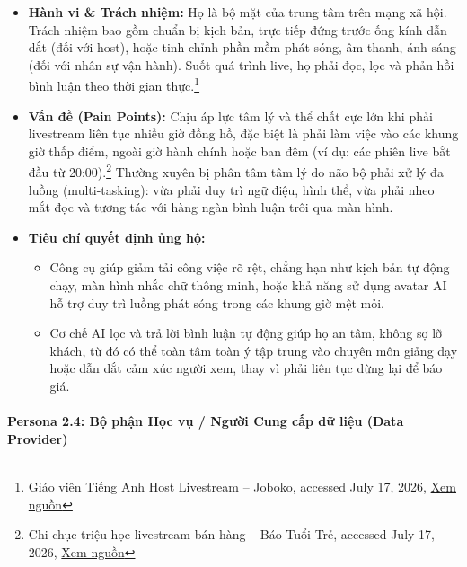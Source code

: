 \begin{itemize}
    \item \textbf{Hành vi \& Trách nhiệm:} Họ là bộ mặt của trung tâm trên mạng xã hội. Trách nhiệm bao gồm chuẩn bị kịch bản, trực tiếp đứng trước ống kính dẫn dắt (đối với host), hoặc tinh chỉnh phần mềm phát sóng, âm thanh, ánh sáng (đối với nhân sự vận hành). Suốt quá trình live, họ phải đọc, lọc và phản hồi bình luận theo thời gian thực.\footnote{Giáo viên Tiếng Anh Host Livestream -- Joboko, accessed July 17, 2026, \href{https://vn.joboko.com/viec-lam/giao-vien-tieng-anh-host-livestream-xvi6575019?amp=1}{Xem nguồn}}

    \item \textbf{Vấn đề (Pain Points):} Chịu áp lực tâm lý và thể chất cực lớn khi phải livestream liên tục nhiều giờ đồng hồ, đặc biệt là phải làm việc vào các khung giờ thấp điểm, ngoài giờ hành chính hoặc ban đêm (ví dụ: các phiên live bắt đầu từ 20:00).\footnote{Chi chục triệu học livestream bán hàng -- Báo Tuổi Trẻ, accessed July 17, 2026, \href{https://tuoitre.vn/nld/chi-chuc-trieu-hoc-livestream-ban-hang-196231203114313834.htm}{Xem nguồn}} Thường xuyên bị phân tâm tâm lý do não bộ phải xử lý đa luồng (multi-tasking): vừa phải duy trì ngữ điệu, hình thể, vừa phải nheo mắt đọc và tương tác với hàng ngàn bình luận trôi qua màn hình.

    \item \textbf{Tiêu chí quyết định ủng hộ:}
    \begin{itemize}
        \item Công cụ giúp giảm tải công việc rõ rệt, chẳng hạn như kịch bản tự động chạy, màn hình nhắc chữ thông minh, hoặc khả năng sử dụng avatar AI hỗ trợ duy trì luồng phát sóng trong các khung giờ mệt mỏi.

        \item Cơ chế AI lọc và trả lời bình luận tự động giúp họ an tâm, không sợ lỡ khách, từ đó có thể toàn tâm toàn ý tập trung vào chuyên môn giảng dạy hoặc dẫn dắt cảm xúc người xem, thay vì phải liên tục dừng lại để báo giá.
    \end{itemize}
\end{itemize}

\paragraph{Persona 2.4: Bộ phận Học vụ / Người Cung cấp dữ liệu (Data Provider)}

